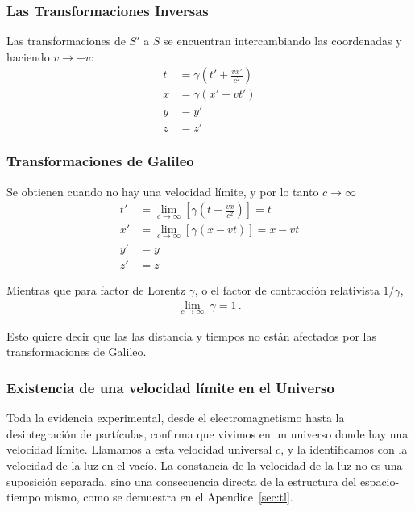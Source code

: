 \documentclass[11pt,a4paper]{article}
\begin{document}
\subsubsection{Las Transformaciones Inversas}
Las transformaciones de $S'$ a $S$ se encuentran intercambiando las coordenadas y haciendo $v \to -v$:
\[
\boxed{
\begin{aligned}
t &= \gamma \left( t' + \frac{vx'}{c^2} \right) \\
x &= \gamma (x' + vt') \\
y &= y' \\
z &= z'
\end{aligned}
}
\]

\subsubsection{Transformaciones de Galileo}
Se obtienen cuando no hay una velocidad límite, y por lo tanto $c\to \infty$
\begin{align*}
t' &= \lim_{c\to\infty}\left[\gamma \left( t - \frac{vx}{c^2} \right)\right] 
    = t\\
x' &= \lim_{c\to\infty}\left[\gamma (x - vt)\right]  = x - vt \\
y' &= y \\
z' &= z
\end{align*}

Mientras que para factor de Lorentz $\gamma$, o el factor de contracción relativista $1/\gamma$, 
\begin{align}
    \lim_{c\to\infty}\ \gamma = 1\,. 
\end{align}

Esto quiere decir que las las distancia y tiempos no están afectados por las transformaciones de Galileo.

\subsubsection{Existencia de una velocidad límite en el Universo}

Toda la evidencia experimental, desde el electromagnetismo hasta la desintegración de partículas, confirma que vivimos en un universo donde hay una velocidad límite. Llamamos a esta velocidad universal $c$, y la identificamos con la velocidad de la luz en el vacío. La constancia de la velocidad de la luz no es una suposición separada, sino una consecuencia directa de la estructura del espacio-tiempo mismo, como se demuestra en el Apendice~\ref{sec:tl}.
\end{document}
